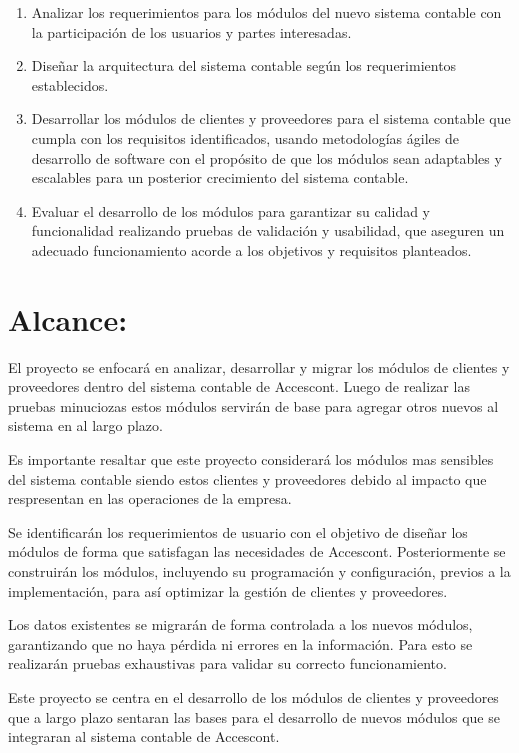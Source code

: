 \documentclass{article}
\begin{document}
\begin{enumerate}
    \item Analizar los requerimientos para los módulos del nuevo sistema contable con la participación de los usuarios y partes interesadas.
    
    \item Diseñar la arquitectura del sistema contable según los requerimientos establecidos.   
    \item Desarrollar los módulos de clientes y proveedores para el sistema contable que cumpla con los requisitos identificados, usando metodologías ágiles de desarrollo de software con el propósito de que los módulos sean adaptables y escalables para un posterior crecimiento del sistema contable.  
    
    \item Evaluar el desarrollo de los módulos para garantizar su calidad y funcionalidad realizando pruebas de validación y usabilidad, que aseguren un adecuado funcionamiento acorde a los objetivos y requisitos planteados.  
\end{enumerate}


\section{Alcance:}
El proyecto se enfocará en analizar, desarrollar y migrar los módulos de clientes y proveedores dentro del sistema contable de Accescont. Luego de realizar las pruebas minuciozas estos módulos servirán de base para agregar otros nuevos al sistema en al largo plazo.

Es importante resaltar que este proyecto considerará los módulos mas sensibles del sistema contable siendo estos clientes y proveedores debido al impacto que respresentan en las operaciones de la empresa.

Se identificarán los requerimientos de usuario con el objetivo de diseñar los módulos de forma que satisfagan las necesidades de Accescont. Posteriormente se construirán los módulos, incluyendo su programación y configuración, previos a la implementación, para así optimizar la gestión de clientes y proveedores.

Los datos existentes se migrarán de forma controlada a los nuevos módulos, garantizando que no haya pérdida ni errores en la información. Para esto se realizarán pruebas exhaustivas para validar su correcto funcionamiento.

Este proyecto se centra en el desarrollo de los módulos de clientes y proveedores que a largo plazo sentaran las bases para el desarrollo de nuevos módulos que se integraran al sistema contable de Accescont.
\end{document}
